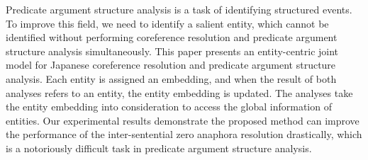 Predicate argument structure analysis is a task of identifying structured events. To improve this field, we need to identify a salient entity, which cannot be identified without performing coreference resolution and predicate argument structure analysis simultaneously. This paper presents an entity-centric joint model for Japanese coreference resolution and predicate argument structure analysis. Each entity is assigned an embedding, and when the result of both analyses refers to an entity, the entity embedding is updated. The analyses take the entity embedding into consideration to access the global information of entities. Our experimental results demonstrate the proposed method can improve the performance of the inter-sentential zero anaphora resolution drastically, which is a notoriously difficult task in predicate argument structure analysis.
